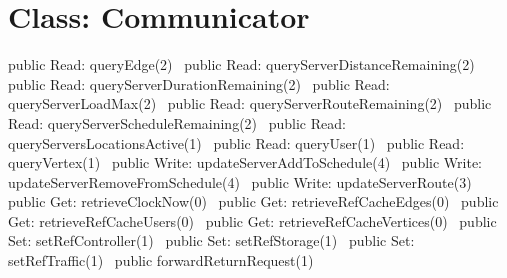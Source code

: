 \section*{Class: Communicator}
\nwenddocs{}\endmoddef{}
public \LA{}Read: queryEdge(2)~{\nwtagstyle{}}\RA{}
public \LA{}Read: queryServerDistanceRemaining(2)~{\nwtagstyle{}}\RA{}
public \LA{}Read: queryServerDurationRemaining(2)~{\nwtagstyle{}}\RA{}
public \LA{}Read: queryServerLoadMax(2)~{\nwtagstyle{}}\RA{}
public \LA{}Read: queryServerRouteRemaining(2)~{\nwtagstyle{}}\RA{}
public \LA{}Read: queryServerScheduleRemaining(2)~{\nwtagstyle{}}\RA{}
public \LA{}Read: queryServersLocationsActive(1)~{\nwtagstyle{}}\RA{}
public \LA{}Read: queryUser(1)~{\nwtagstyle{}}\RA{}
public \LA{}Read: queryVertex(1)~{\nwtagstyle{}}\RA{}
\nwendcode{}\nwdocspar
{}
\nwenddocs{}\plusendmoddef
public \LA{}Write: updateServerAddToSchedule(4)~{\nwtagstyle{}}\RA{}
public \LA{}Write: updateServerRemoveFromSchedule(4)~{\nwtagstyle{}}\RA{}
public \LA{}Write: updateServerRoute(3)~{\nwtagstyle{}}\RA{}
\nwendcode{}\nwdocspar
{}
\nwenddocs{}\plusendmoddef
public \LA{}Get: retrieveClockNow(0)~{\nwtagstyle{}}\RA{}
public \LA{}Get: retrieveRefCacheEdges(0)~{\nwtagstyle{}}\RA{}
public \LA{}Get: retrieveRefCacheUsers(0)~{\nwtagstyle{}}\RA{}
public \LA{}Get: retrieveRefCacheVertices(0)~{\nwtagstyle{}}\RA{}
public \LA{}Set: setRefController(1)~{\nwtagstyle{}}\RA{}
public \LA{}Set: setRefStorage(1)~{\nwtagstyle{}}\RA{}
public \LA{}Set: setRefTraffic(1)~{\nwtagstyle{}}\RA{}
public \LA{}forwardReturnRequest(1)~{\nwtagstyle{}}\RA{}
\nwendcode{}\nwdocspar


